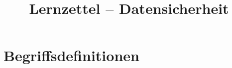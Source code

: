 \documentclass[a4paper,12pt]{article}
\title{\textbf{Lernzettel – Datensicherheit}}
\author{}
\date{}
\begin{document}
\maketitle
\tableofcontents
\newpage

\section{Begriffsdefinitionen}
\end{document}
